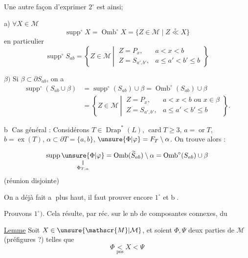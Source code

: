 Une autre façon  d'exprimer $2^{\circ}$ est ainsi; 

a) $\forall X\in\mathscr{M}$
\[
\operatorname{supp}^{\circ}X=\operatorname{Omb}^{\circ}X=\{Z\in\mathscr{M}\mid Z\overset{\circ}{\ll}X\}
\]
en particulier
\[
\operatorname{supp}^{\circ}S_{ab}=\left\{Z\in\mathscr{M}\ \left|\
\begin{array}{ll}
Z=P_x,&a<x<b\\
Z=S_{a',b'},&a\leq a'<b'\leq b
\end{array}\right.\right\}
\]

$\beta)$ Si $\beta\subset\partial S_{ab}$, on a
\[
\begin{aligned}
\operatorname{supp}^{\circ}(S_{ab}\cup\beta)&=\operatorname{supp}^{\circ}(S_{ab})\cup\beta=\operatorname{Omb}^{\circ}(S_{ab})\cup\beta\\
&=\left\{Z\in\mathscr{M}\ \left|\
\begin{array}{ll}
Z=P_x,&a<x<b\text{ ou }x\in\beta\\
Z=S_{a',b'},&a\leq a'<b'\leq b
\end{array}\right.\right\}.
\end{aligned}
\]

\textcircled{b} Cas général : Considérons $T\in\operatorname{Drap}^{*}(L)$, $\operatorname{card}T\geq3$, \deleted{$\alpha\in$} $a=\operatorname{or}T$, $b=\operatorname{ex}(T)$, \deleted{$\alpha$} $\alpha\subset\partial T=\{a,b\}$,  $\unsure{\Phi|\varphi}=F_T\setminus\alpha$. On trouve alors :

\scanpage{113}

\[
\operatorname{supp}\underset{\substack{\parallel\\\Phi_{T,\alpha}}}{\unsure{\Phi|\varphi}}
=\operatorname{Omb}(\widetilde S_{ab})\setminus\alpha
=\operatorname{Omb}^{\circ}(S_{ab})\cup\beta
\]
\hfill(réunion disjointe)

On a déjà fait \textcircled{a} plus haut, il faut prouver encore \textcircled{\scriptsize $1^{\circ}$} et \textcircled{b}.

Prouvons $1^{\circ})$. Cela résulte, par réc. sur le nb de composantes connexes, du

\noindent{}%
\uline{Lemme} Soit $X\in\unsure{\mathscr{M}|\mathcal{M}}$, et soient $\Phi,\Psi$ deux parties de $\mathscr{M}$ (préfigures ?) telles que
\[
\Phi\underset{\mathrm{pos}}{<}X<\Psi
\]

